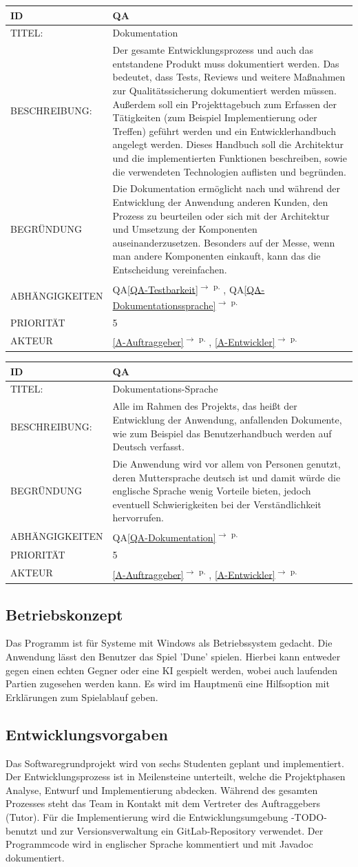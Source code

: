 \documentclass[12pt]{article}
\newcounter{fa}
\newcounter{nfa}
\newcommand{\nfa}[7]{
\refstepcounter{nfa}\label{#7}
\begin{tabularx}{16cm}{l|X}
\textbf{ID} & \textbf{QA\arabic{nfa}} \\
\hline
TITEL: & #1 \\
\hline
BESCHREIBUNG: & #2 \\
\hline
BEGRÜNDUNG & #3 \\ 
\hline
ABHÄNGIGKEITEN & #4\\ 
\hline 
PRIORITÄT & #5\\ 
\hline 
AKTEUR & #6
\end{tabularx}
}
\newcommand{\rref}[1]{\ref{#1}\textsuperscript{$\rightarrow$ p. \pageref{#1}}}
\newcommand{\nfaref}[1]{QA\ref{#1}\textsuperscript{$\rightarrow$ p. \pageref{#1}}}
\begin{document}
\nfa{Dokumentation}{Der gesamte Entwicklungsprozess und auch das entstandene Produkt muss dokumentiert werden. Das bedeutet, dass Tests, Reviews und weitere Maßnahmen zur Qualitätssicherung dokumentiert werden müssen. Außerdem soll ein Projekttagebuch zum Erfassen der Tätigkeiten (zum Beispiel Implementierung oder Treffen) geführt werden und ein Entwicklerhandbuch angelegt werden. Dieses Handbuch soll die Architektur und die implementierten Funktionen beschreiben, sowie die verwendeten Technologien auflisten und begründen.}{Die Dokumentation ermöglicht nach und während der Entwicklung der Anwendung anderen Kunden, den Prozess zu beurteilen oder sich mit der Architektur und Umsetzung der Komponenten auseinanderzusetzen. Besonders auf der Messe, wenn man andere Komponenten einkauft, kann das die Entscheidung vereinfachen.}{\nfaref{QA-Testbarkeit}, \nfaref{QA-Dokumentationssprache}}{5}{\rref{A-Auftraggeber}, \rref{A-Entwickler}}{QA-Dokumentation}

\nfa{Dokumentations-Sprache}{Alle im Rahmen des Projekts, das heißt der Entwicklung der Anwendung, anfallenden Dokumente, wie zum Beispiel das Benutzerhandbuch werden auf Deutsch verfasst.}{Die Anwendung wird vor allem von Personen genutzt, deren Muttersprache deutsch ist und damit würde die englische Sprache wenig Vorteile bieten, jedoch eventuell Schwierigkeiten bei der Verständlichkeit hervorrufen. }{\nfaref{QA-Dokumentation}}{5}{\rref{A-Auftraggeber}, \rref{A-Entwickler}}{QA-Dokumentationssprache}

\newpage

\flushleft

\subsection{Betriebskonzept}

Das Programm ist für Systeme mit Windows als Betriebssystem gedacht. Die Anwendung lässt den Benutzer das Spiel 'Dune' spielen. Hierbei kann entweder gegen einen echten Gegner oder eine KI gespielt werden, wobei auch laufenden Partien zugesehen werden kann. Es wird im Hauptmenü eine Hilfsoption mit Erklärungen zum Spielablauf geben.

\subsection{Entwicklungsvorgaben}

Das Softwaregrundprojekt wird von sechs Studenten geplant und implementiert. Der Entwicklungsprozess ist in Meilensteine unterteilt, welche die Projektphasen Analyse, Entwurf und Implementierung abdecken. Während des gesamten Prozesses steht das Team in Kontakt mit dem Vertreter des Auftraggebers (Tutor). Für die Implementierung wird die Entwicklungsumgebung -TODO- benutzt und zur Versionsverwaltung ein GitLab-Repository verwendet. Der Programmcode wird in englischer Sprache kommentiert und mit Javadoc dokumentiert. 
\end{document}
